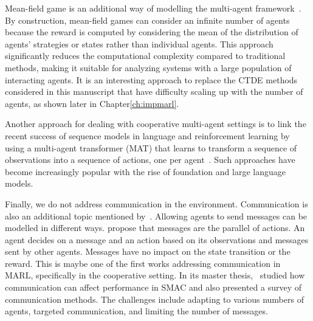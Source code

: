 Mean-field game is an additional way of modelling the multi-agent framework~\citep{lauriere2022learning}.
By construction, mean-field games can consider an infinite number of agents because the reward is computed by considering the mean of the distribution of agents' strategies or states rather than individual agents.
This approach significantly reduces the computational complexity compared to traditional methods, making it suitable for analyzing systems with a large population of interacting agents.
It is an interesting approach to replace the CTDE methods considered in this manuscript that have difficulty scaling up with the number of agents, as shown later in Chapter\ref{ch:impmarl}.

Another approach for dealing with cooperative multi-agent settings is to link the recent success of sequence models in language and reinforcement learning by using a multi-agent transformer (MAT) that learns to transform a sequence of observations into a sequence of actions, one per agent~\citep{wen2022multiagent}.
Such approaches have become increasingly popular with the rise of foundation and large language models.

Finally, we do not address communication in the environment.
Communication is also an additional topic mentioned by~\citep{DecPomdp}.
Allowing agents to send messages can be modelled in different ways.
\cite{foerster2016learning} propose that messages are the parallel of actions.
An agent decides on a message and an action based on its observations and messages sent by other agents.
Messages have no impact on the state transition or the reward.
This is maybe one of the first works addressing communication in MARL, specifically in the cooperative setting.
In its master thesis,~\cite{fombellida2020master} studied how communication can affect performance in SMAC and also presented a survey of communication methods.
The challenges include adapting to various numbers of agents, targeted communication, and limiting the number of messages.


